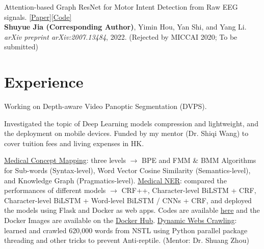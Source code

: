 \documentclass{my_cv}
\begin{document}
\hspace*{\fill}

\workitemsone
{Attention-based Graph ResNet for Motor Intent Detection from Raw EEG signals. \href{https://arxiv.org/abs/2007.13484}{[Paper]}\href{https://github.com/SuperBruceJia/EEG-DL}{[Code]}\\
	\textbf{Shuyue Jia (Corresponding Author)}, Yimin Hou, Yan Shi, and Yang Li.\\
	\emph{arXiv preprint arXiv:2007.13484}, 2022. (Rejected by MICCAI 2020; To be submitted)
}
	
\hspace*{\fill}

\section{Experience}

\workitemsone
{Working on Depth-aware Video Panoptic Segmentation (DVPS).}

\hspace*{\fill}

\workitemstwo
{Investigated the topic of Deep Learning models compression and lightweight, and the deployment on mobile devices.}
{Funded by my mentor (Dr. Shiqi Wang) to cover tuition fees and living expenses in HK.}

\hspace*{\fill}

%

\workitemsthree
{\href{https://github.com/SuperBruceJia/Medical-Concept-Mapping}{Medical Concept Mapping}: three levels $\rightarrow$ BPE and FMM \& BMM Algorithms for Sub-words (Syntax-level), Word Vector Cosine Similarity (Semantics-level), and Knowledge Graph (Pragmatics-level).}
{\href{https://github.com/SuperBruceJia/MedicalNER}{Medical NER}: compared the performances of different models $\rightarrow$ CRF++, Character-level BiLSTM + CRF, Character-level BiLSTM + Word-level BiLSTM / CNNs + CRF, and deployed the models using Flask and Docker as web apps. Codes are available \href{https://github.com/SuperBruceJia/pytorch-flask-deploy-webapp}{here} and the Docker Images are available on the \href{https://hub.docker.com/u/shuyuej}{Docker Hub}.}
{\href{https://github.com/SuperBruceJia/dynamic-web-crawlering-python}{Dynamic Webs Crawling}: learned and crawled 620,000 words from NSTL using Python parallel package threading and other tricks to prevent Anti-reptile. (Mentor: Dr. Shuang Zhou)}
\end{document}
